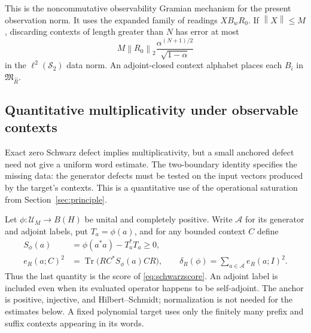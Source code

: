 \documentclass[11pt,a4paper]{amsart}
\numberwithin{equation}{section}
\theoremstyle{definition}
\theoremstyle{remark}
\newcommand{\Sch}{\mathcal S}
\DeclareMathOperator{\Tr}{Tr}
\newcommand{\norm}[1]{\left\lVert#1\right\rVert}
\begin{document}
This is the noncommutative observability Gramian mechanism \cite{BBF} for the present observation norm. It uses the expanded family of readings $XB_wR_0$. If $\norm X\le M$, discarding contexts of length greater than $N$ has error at most
\[
 M\norm{R_0}_2\frac{\alpha^{(N+1)/2}}{\sqrt{1-\alpha}}
\]
in the $\ell^2(\Sch_2)$ data norm. An adjoint-closed context alphabet places each $B_i$ in $\mathfrak M_{\widehat R}$.

\subsection{Quantitative multiplicativity under observable contexts}\label{subsec:contextual_multiplicativity}
Exact zero Schwarz defect implies multiplicativity, but a small anchored defect need not give a uniform word estimate. The two-boundary identity specifies the missing data: the generator defects must be tested on the input vectors produced by the target's contexts. This is a quantitative use of the operational saturation from Section~\ref{sec:principle}.

Let $\phi:\mathcal U_M\to B(H)$ be unital and completely positive. Write $\mathcal A$ for its generator and adjoint labels, put $T_a=\phi(a)$, and for any bounded context $C$ define
\begin{equation}\label{eq:contextual_schwarz_reading}
 \begin{split}
 S_\phi(a)&=\phi(a^*a)-T_a^*T_a\ge0,\\
 e_R(a;C)^2&=\Tr\big(RC^*S_\phi(a)CR\big),
 \qquad \delta_R(\phi)=\sum_{a\in\mathcal A}e_R(a;I)^2.
 \end{split}
\end{equation}
Thus the last quantity is the score of \eqref{eq:schwarzscore}. An adjoint label is included even when its evaluated operator happens to be self-adjoint. The anchor is positive, injective, and Hilbert--Schmidt; normalization is not needed for the estimates below. A fixed polynomial target uses only the finitely many prefix and suffix contexts appearing in its words.
\end{document}
